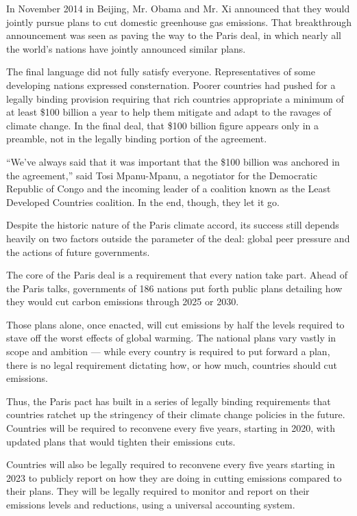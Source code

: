 In November 2014 in Beijing, Mr. Obama and Mr. Xi announced that they
would jointly pursue plans to cut domestic greenhouse gas emissions.
That breakthrough announcement was seen as paving the way to the Paris
deal, in which nearly all the world's nations have jointly announced
similar plans.

The final language did not fully satisfy everyone. Representatives of
some developing nations expressed consternation. Poorer countries had
pushed for a legally binding provision requiring that rich countries
appropriate a minimum of at least \$100 billion a year to help them
mitigate and adapt to the ravages of climate change. In the final deal,
that \$100 billion figure appears only in a preamble, not in the legally
binding portion of the agreement.

``We've always said that it was important that the \$100 billion was
anchored in the agreement,'' said Tosi Mpanu-Mpanu, a negotiator for the
Democratic Republic of Congo and the incoming leader of a coalition
known as the Least Developed Countries coalition. In the end, though,
they let it go.

Despite the historic nature of the Paris climate accord, its success
still depends heavily on two factors outside the parameter of the deal:
global peer pressure and the actions of future governments.

The core of the Paris deal is a requirement that every nation take part.
Ahead of the Paris talks, governments of 186 nations put forth public
plans detailing how they would cut carbon emissions through 2025 or
2030.

Those plans alone, once enacted, will cut emissions by half the levels
required to stave off the worst effects of global warming. The national
plans vary vastly in scope and ambition --- while every country is
required to put forward a plan, there is no legal requirement dictating
how, or how much, countries should cut emissions.

Thus, the Paris pact has built in a series of legally binding
requirements that countries ratchet up the stringency of their climate
change policies in the future. Countries will be required to reconvene
every five years, starting in 2020, with updated plans that would
tighten their emissions cuts.

Countries will also be legally required to reconvene every five years
starting in 2023 to publicly report on how they are doing in cutting
emissions compared to their plans. They will be legally required to
monitor and report on their emissions levels and reductions, using a
universal accounting system.

